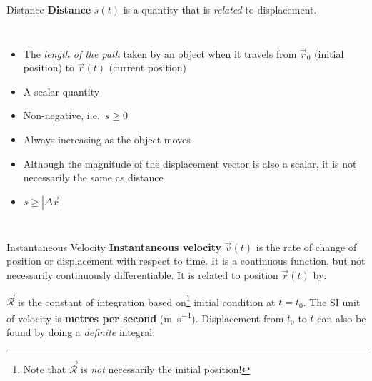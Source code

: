 \documentclass[12pt,compress,aspectratio=169,dvipsnames]{beamer}
\begin{document}
\begin{frame}{Distance}
  \textbf{Distance} $s(t)$ is a quantity that is \emph{related} to displacement.
  \begin{columns}
    \begin{itemize}
    \item The \emph{length of the path} taken by an object when it travels from
      $\vec r_0$ (initial position) to $\vec r(t)$ (current position)
    \item A scalar quantity
    \item Non-negative, i.e.\ $s\geq 0$
    \item Always increasing as the object moves
    \item Although the magnitude of the displacement vector is also a scalar,
      it is not necessarily the same as distance
    \item $s\geq |\Delta\vec r|$
    \end{itemize}
    
  \end{columns}
\end{frame}



\begin{frame}{Instantaneous Velocity}
  \textbf{Instantaneous velocity} $\vec v(t)$ is the rate of change of
  position or displacement with respect to time. It is a continuous function,
  but not necessarily continuously differentiable. It is related to position
  $\vec r(t)$ by:
  

  $\vec{\mathcal R}$ is the constant of integration based on\footnote{Note that
  $\vec{\mathcal R}$ is \emph{not} necessarily the initial position!} initial
  condition at $t=t_0$. The SI unit of velocity is \textbf{metres per second}
  (\si{\metre\per\second}). Displacement from $t_0$ to $t$ can also be found by
  doing a \emph{definite} integral:

  \vspace{.2in}
\end{frame}
\end{document}
